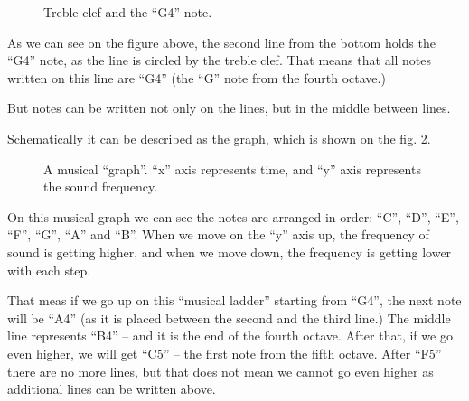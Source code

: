 \documentclass[../sparc.tex]{subfiles}
\begin{document}
\begin{figure}[ht]
  \centering
  \label{fig:lilypond-clef-example}
  \caption{Treble clef and the ``G4'' note.}
\end{figure}

As we can see on the figure above, the second line from the bottom holds the
``G4'' note, as the line is circled by the treble clef.  That means that all
notes written on this line are ``G4'' (the ``G'' note from the fourth octave.)

But notes can be written not only on the lines, but in the middle between lines.

Schematically it can be described as the graph, which is shown on the
fig. \ref{fig:lilypond-music-graph-1}.

\begin{figure}[ht]
  \centering
  \label{fig:lilypond-music-graph-1}
  \caption{A musical ``graph''.  ``x'' axis represents time, and ``y'' axis
    represents the sound frequency.}
\end{figure}

On this musical graph we can see the notes are arranged in order: ``C'', ``D'',
``E'', ``F'', ``G'', ``A'' and ``B''.  When we move on the ``y'' axis up, the
frequency of sound is getting higher, and when we move down, the frequency is
getting lower with each step.

That meas if we go up on this ``musical ladder'' starting from ``G4'', the next
note will be ``A4'' (as it is placed between the second and the third line.)
The middle line represents ``B4'' -- and it is the end of the fourth octave.
After that, if we go even higher, we will get ``C5'' -- the first note from the
fifth octave.  After ``F5'' there are no more lines, but that does not mean we
cannot go even higher as additional lines can be written above.
\end{document}
